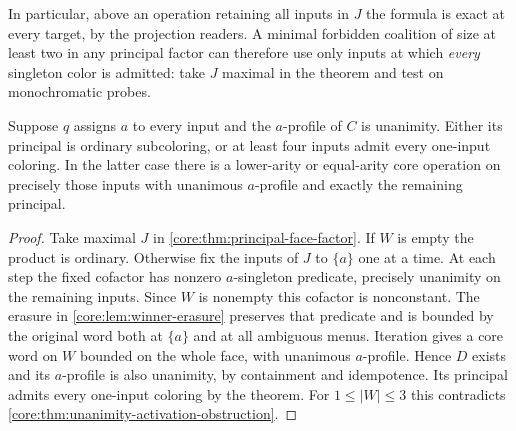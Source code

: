 In particular, above an operation retaining all inputs in $J$ the
formula is exact at every target, by the projection readers. A minimal
forbidden coalition of size at least two in any principal factor can
therefore use only inputs at which \emph{every} singleton color is
admitted: take $J$ maximal in the theorem and test on monochromatic
probes.

\begin{corollary}
\label{core:cor:unanimity-released-inputs}
Suppose $q$ assigns $a$ to every input and the $a$-profile of $C$ is
unanimity. Either its principal is ordinary subcoloring, or at least
four inputs admit every one-input coloring. In the latter case there
is a lower-arity or equal-arity core operation on precisely those
inputs with unanimous $a$-profile and exactly the remaining principal.
\end{corollary}
\begin{proof}
Take maximal $J$ in \cref{core:thm:principal-face-factor}. If $W$ is
empty the product is ordinary. Otherwise fix the inputs of $J$ to
$\{a\}$ one at a time. At each step the fixed cofactor has nonzero
$a$-singleton predicate, precisely unanimity on the remaining inputs.
Since $W$ is nonempty this cofactor is nonconstant.
The erasure in \cref{core:lem:winner-erasure} preserves that predicate
and is bounded by the original word both at $\{a\}$ and at all
ambiguous menus. Iteration gives a core word on $W$ bounded on the
whole face, with unanimous $a$-profile. Hence $D$ exists and its
$a$-profile is also unanimity, by containment and idempotence.
Its principal admits every one-input coloring by the theorem.
For $1\leq |W|\leq3$ this contradicts
\cref{core:thm:unanimity-activation-obstruction}.
\end{proof}

